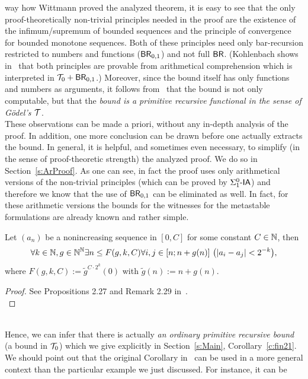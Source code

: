 way how Wittmann proved the analyzed theorem, it is easy to see 
that the only proof-theoretically non-trivial principles needed in the proof are 
the existence of the infimum/supremum of bounded sequences and 
the principle of convergence for bounded monotone sequences.
Both of these principles need only bar-recursion restricted to numbers and functions ($\textsf{\upshape BR}_{0,1}$)
and not full $\textsf{\upshape BR}$. (Kohlenbach shows in~\cite{Kohlenbach08, Kohlenbach00} that both principles
are provable from arithmetical comprehension which is interpreted in $\mathcal{T}_0+\textsf{\upshape BR}_{0,1}$.) 
Moreover, since the bound itself has only functions and numbers as arguments, 
it follows from~\cite{Schwichtenberg79, Kohlenbach99} that
the bound is not only computable, but that the {\em bound
is a primitive recursive functional in the sense of G\"odel's $\mathcal{T}$}.\\
These observations can be made a priori, without any in-depth analysis of the proof. In addition,
one more conclusion can be drawn before one actually extracts the bound. In general, it is helpful, and sometimes
even necessary, to simplify (in the sense of proof-theoretic strength) the analyzed proof. We do so
in Section~\ref{s:ArProof}. As one can see, in fact the proof uses only arithmetical versions of
the non-trivial principles (which can be proved by $\Sigma^0_1\textsf{\upshape -}\textsf{\upshape IA}$) and therefore we 
know that the use of $\textsf{\upshape BR}_{0,1}$ can be eliminated as well. 
In fact, for these arithmetic versions the bounds for the witnesses for the metastable
formulations are already known and rather simple.
\begin{prop}\label{p:Ulrich}
Let $(a_n)$ be a nonincreasing sequence in $[0,C]$ for some constant $C\in\mathbb{N}$, then
\[ \forall k\in\NN,g\in\NN^\NN\exists n\leq F(g,k,C)\forall i,j\in[n;n+g(n)]\ \big(|a_i-a_j|<2^{-k}\big), \]
where $F(g,k,C):={\tilde g}^{C\cdot 2^k}(0)$ with $\tilde g(n):=n+g(n)$.
\end{prop}
\begin{proof}
See Propositions 2.27 and Remark 2.29 in~\cite{Kohlenbach08}.\\
\end{proof}\\
Hence, we can infer that there is actually {\em an ordinary primitive recursive bound} (a bound in $\mathcal{T}_0$)
which we give explicitly in Section~\ref{s:Main}, Corollary~\ref{c:fin21}.\\
We should point out that the original Corollary in~\cite{GK08} can be used
in a more general context than the particular example we just discussed. For instance, it can be 
